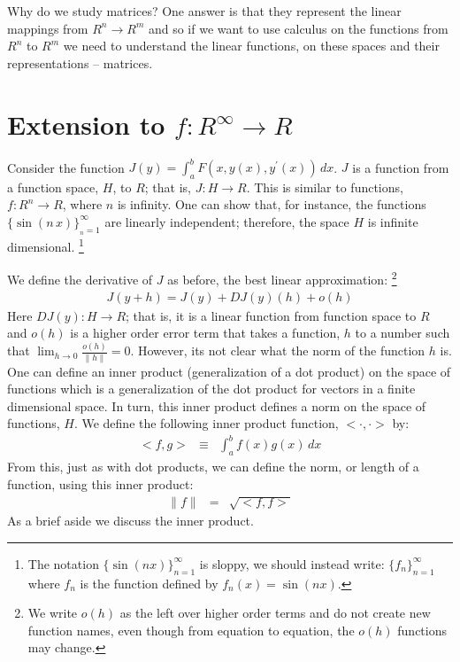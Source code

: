\documentclass{article}
\begin{document}
Why do we study matrices? One answer is that they represent the linear mappings
from $R^n \rightarrow R^m$ and so if we want to use calculus on the functions
from $R^n$ to $R^m$ we need to understand the linear functions, on these
spaces and their representations -- matrices.

\section{Extension to $f:R^\infty \rightarrow R$}
Consider the function $J(y) = \int_{a}^b F(x, y(x), y^\prime(x)) \, dx$. $J$ is
a function from a function space, $H$, to $R$; that is, $J: H \rightarrow R$.
This is similar to functions,
$f:R^n \rightarrow R$, where $n$ is infinity. One can show that, for instance, the
functions $\{\sin(n\, x)\}_{_n=1}^\infty$ are linearly independent; therefore,
the space $H$ is infinite dimensional.%
\footnote{The notation $\{\sin(n x)\}_{n=1}^\infty$ is sloppy, we should instead write:
$\{f_n\}_{n=1}^\infty$ where $f_n$ is the function defined by $f_n(x) = \sin(n x)$.}

We define the derivative of $J$ as before, the best linear approximation:%
\footnote{We write $o(h)$ as the left over higher order terms and do not create new
function names, even though from equation to equation, the $o(h)$ functions may change.}
\begin{eqnarray}
  J(y + h) = J(y) + DJ(y)(h) + o(h)
\end{eqnarray}
Here $DJ(y): H \rightarrow R$; that is, it is a linear function from
function space to $R$ and $o(h)$ is a
higher order error term that takes a function, $h$ to a number such that
$\lim_{h \rightarrow 0}\frac{o(h)}{\|h\|} = 0$. However, its not clear what the
norm of the function $h$ is. One can define an
inner product (generalization of a dot product) on the space of
functions which is a generalization of the dot product for vectors in
a finite dimensional space. In turn, this inner product defines a norm on the space
of functions, $H$.
We define the following inner product function,
$<\!\cdot, \cdot\!>$ by:
\begin{eqnarray}
  <\!f, g\!> & \equiv & \int_a^b f(x) g(x)\, dx \label{inner_prod}
\end{eqnarray}
From this, just as with dot products, we can define the norm, or length of a function,
using this inner product:
\begin{eqnarray}
  \|f\| & = & \sqrt{<\!f,f\!>}
\end{eqnarray}
As a brief aside we discuss the inner product.
\end{document}
